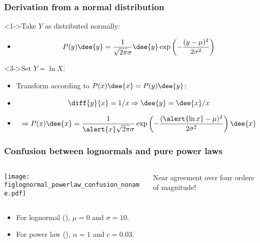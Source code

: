 \begin{frame}
  \frametitle{Derivation from a normal distribution}

  \begin{block}<1->{Take $Y$ as distributed normally:}
    \begin{itemize}
    \item<2->
      $$
      P(y)\dee{y} = \frac{1}{\sqrt{2\pi} \sigma} \dee{y}
      \exp 
      \left(
        -\frac{(y-\mu)^2}
        {2\sigma^2}
      \right)
      $$
    \end{itemize}
  \end{block}

  \begin{block}<3->{Set $Y = \ln X$:}
    \begin{itemize}
    \item<4-> Transform according to $P(x) \dee{x} = P(y) \dee{y}$:
    \item<5->
      $$
      \diff{y}{x} = 1/x \Rightarrow \dee{y} = \dee{x} / x
      $$
    \item<6->
      $$
      \Rightarrow P(x) \dee{x} 
      = \frac{1}{\alert{x} \sqrt{2\pi} \sigma} 
      \exp 
      \left(
        -\frac{(\alert{\ln x}-\mu)^2}
        {2\sigma^2}
      \right)
      \dee{x}
      $$
    \end{itemize}
  \end{block}

\end{frame}

\begin{frame}
  \frametitle{Confusion between lognormals and pure power laws}

  \begin{columns}
    \begin{column}{0.6\textwidth}
      \texttt{[image: figlognormal\_powerlaw\_confusion\_noname.pdf]}    
    \end{column}
    \begin{column}{0.3\textwidth}
      Near agreement over four orders of magnitude!
    \end{column}
  \end{columns}

  \begin{itemize}
  \item For lognormal (), $\mu=0$ and $\sigma=10$.
  \item For power law (), $\alpha=1$ and $c=0.03$.
  \end{itemize}

\end{frame}

